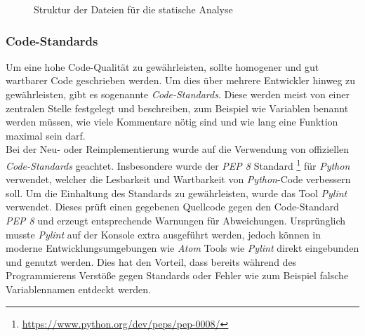 \begin{figure}
\caption{Struktur der Dateien für die statische Analyse}
\label{fig:MobSFStrukAndroid}
\end{figure}

\newpage
\subsubsection{Code-Standards}\label{pylintering}
Um eine hohe Code-Qualität zu gewährleisten, sollte homogener und gut wartbarer Code geschrieben werden. Um dies über mehrere Entwickler hinweg zu gewährleisten, gibt es sogenannte \textit{Code-Standards}. Diese werden meist von einer zentralen Stelle festgelegt und beschreiben, zum Beispiel wie Variablen benannt werden müssen, wie viele Kommentare nötig sind und wie lang eine Funktion maximal sein darf.\\

Bei der Neu- oder Reimplementierung wurde auf die Verwendung von offiziellen \textit{Code-Standards} geachtet. Insbesondere wurde der\textit{ PEP 8} Standard \footnote{\url{https://www.python.org/dev/peps/pep-0008/}} für \textit{Python} verwendet, welcher die Lesbarkeit und Wartbarkeit von \textit{Python}-Code verbessern soll. Um die Einhaltung des Standards zu gewährleisten, wurde das Tool \textit{Pylint} verwendet. Dieses prüft einen gegebenen Quellcode gegen den Code-Standard \textit{PEP 8} und erzeugt entsprechende Warnungen für Abweichungen. Ursprünglich musste \textit{Pylint} auf der Konsole extra ausgeführt werden, jedoch können in moderne Entwicklungsumgebungen wie \textit{Atom} Tools wie \textit{Pylint} direkt eingebunden und genutzt werden. Dies hat den Vorteil, dass bereits während des Programmierens Verstöße gegen Standards oder Fehler wie zum Beispiel falsche Variablennamen entdeckt werden.\\

